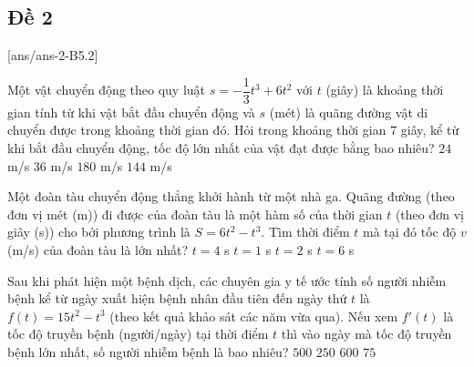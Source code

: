 \subsection{Đề 2}
[ans/ans-2-B5.2]
\caulc
\begin{ex}%
Một vật chuyển động theo quy luật $s=-\dfrac{1}{3}t^3+6t^2$ với $t$ (giây) là khoảng thời gian tính từ khi vật bắt đầu chuyển động và $s$ (mét) là quãng đường vật di chuyển được trong khoảng thời gian đó. Hỏi trong khoảng thời gian $7$ giây, kể từ khi bắt đầu chuyển động, tốc độ lớn nhất của vật đạt được bằng bao nhiêu?
\choice
{$24$ m/s}
{\True $36$ m/s}
{$180$ m/s}
{$144$ m/s}
\end{ex}

\begin{ex}%
 Một đoàn tàu chuyển động thẳng khởi hành từ một nhà ga. Quãng đường (theo đơn vị mét (m)) đi được của đoàn tàu là một hàm số của thời gian $t$ (theo đơn vị giây (s)) cho bởi phương trình là $S=6t^2-t^3$. Tìm thời điểm $t$ mà tại đó tốc độ $v$(m/s) của đoàn tàu là lớn nhất?
\choice
{$t=4$ s}
{$t=1$ s}
{\True $t=2$ s}
{$t=6$ s}
\end{ex}

\begin{ex}%
Sau khi phát hiện một bệnh dịch, các chuyên gia y tế ước tính số người nhiễm bệnh kể từ ngày xuất hiện bệnh nhân đầu tiên đến ngày thứ $t$ là  $f(t) =15t^2 -t^3$ (theo kết quả khảo sát các năm vừa qua). Nếu xem $f'(t)$ là tốc độ truyền bệnh (người/ngày) tại thời điểm $t$ thì vào ngày mà tốc độ truyền bệnh lớn nhất, số người nhiễm bệnh là bao nhiêu?
\choice
{$500$}
{\True $250$}
{$600$}
{$75$}
\end{ex}

